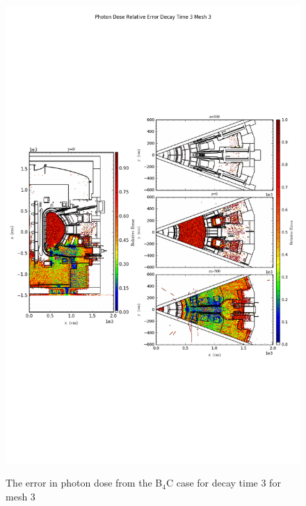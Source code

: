 \begin{figure}[ht!]
\centering
\includegraphics[trim={0cm 9cm 0cm 10cm},clip,scale=0.75]{../plots/final_model_nob4c/Photon_Dose_Relative_Error_Decay_Time_3_Mesh_3.png}
\label{fig:photons_dc3_no4bc_m3_error}
\caption{The error in photon dose from the B$_4$C case for decay time 3 for mesh 3}
\end{figure}
